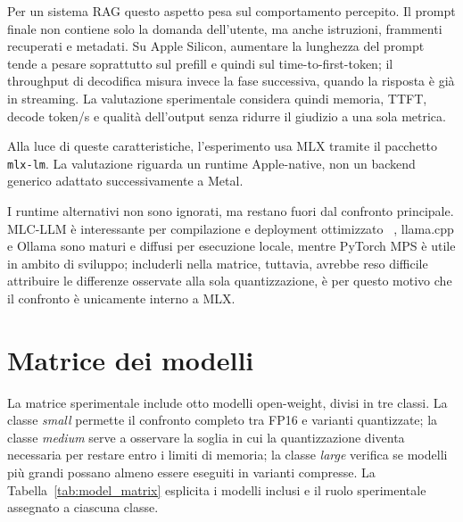 Per un sistema RAG questo aspetto pesa sul comportamento percepito. Il prompt
finale non contiene solo la domanda dell'utente, ma anche istruzioni, frammenti
recuperati e metadati. Su
Apple Silicon, aumentare la lunghezza del prompt tende a pesare soprattutto sul
prefill e quindi sul time-to-first-token; il throughput di decodifica misura
invece la fase successiva, quando la risposta è già in streaming. La
valutazione sperimentale considera quindi memoria, TTFT, decode token/s e
qualità dell'output senza ridurre il giudizio a una sola metrica.

Alla luce di queste caratteristiche, l'esperimento usa MLX tramite il pacchetto
\texttt{mlx-lm}. La valutazione riguarda un runtime Apple-native, non un
backend generico adattato successivamente a Metal.

I runtime alternativi non sono ignorati, ma restano fuori dal confronto
principale. MLC-LLM è interessante per compilazione e deployment ottimizzato
~\cite{mlc2025llm}, llama.cpp e Ollama sono maturi e diffusi per esecuzione
locale, mentre PyTorch MPS è utile in ambito di sviluppo; includerli nella
matrice, tuttavia, avrebbe reso difficile attribuire le differenze osservate alla
sola quantizzazione, è per questo motivo che il confronto è unicamente interno a MLX.

\section{Matrice dei modelli}
\label{sec:experimental_model_matrix}

La matrice sperimentale include otto modelli open-weight, divisi in tre classi.
La classe \emph{small} permette il confronto completo tra FP16 e varianti
quantizzate; la classe \emph{medium} serve a osservare la soglia in cui la
quantizzazione diventa necessaria per restare entro i limiti di memoria; la
classe \emph{large} verifica se modelli più grandi possano almeno essere
eseguiti in varianti compresse.
La Tabella~\ref{tab:model_matrix} esplicita i modelli inclusi e il ruolo
sperimentale assegnato a ciascuna classe.

